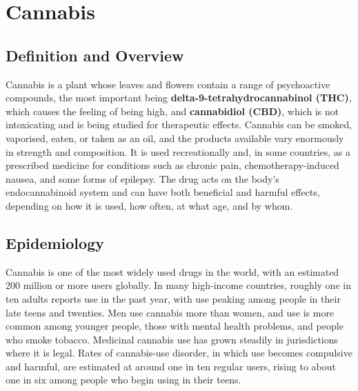 \chapter{Cannabis}

\section*{Definition and Overview}
Cannabis is a plant whose leaves and flowers contain a range of psychoactive compounds, the most important being \textbf{delta-9-tetrahydrocannabinol (THC)}, which causes the feeling of being high, and \textbf{cannabidiol (CBD)}, which is not intoxicating and is being studied for therapeutic effects. Cannabis can be smoked, vaporised, eaten, or taken as an oil, and the products available vary enormously in strength and composition. It is used recreationally and, in some countries, as a prescribed medicine for conditions such as chronic pain, chemotherapy-induced nausea, and some forms of epilepsy. The drug acts on the body's endocannabinoid system and can have both beneficial and harmful effects, depending on how it is used, how often, at what age, and by whom.

\section*{Epidemiology}
Cannabis is one of the most widely used drugs in the world, with an estimated 200 million or more users globally. In many high-income countries, roughly one in ten adults reports use in the past year, with use peaking among people in their late teens and twenties. Men use cannabis more than women, and use is more common among younger people, those with mental health problems, and people who smoke tobacco. Medicinal cannabis use has grown steadily in jurisdictions where it is legal. Rates of cannabis-use disorder, in which use becomes compulsive and harmful, are estimated at around one in ten regular users, rising to about one in six among people who begin using in their teens.

